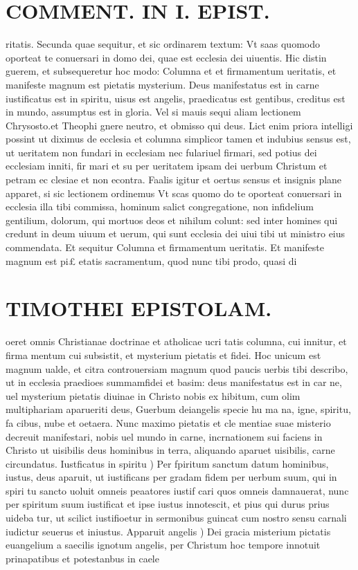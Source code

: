 \documentclass{article}
\begin{document}
\begin{pages}
\section*{COMMENT. IN I. EPIST. }
\marginpar{[ p.90 ]}\pstart ritatis. Secunda quae sequitur, et sic ordinarem textum: Vt saas quomodo oporteat te conuersari in domo dei, quae est ecclesia dei uiuentis. Hic distin guerem, et subsequeretur hoc modo: Columna et et firmamentum ueritatis, et manifeste magnum est pietatis mysterium. Deus manifestatus est in carne iustificatus est in spiritu, uisus est angelis, praedicatus est gentibus, creditus est in mundo, assumptus est in gloria. Vel si mauis sequi aliam lectionem Chrysosto.et Theophi gnere neutro, et obmisso qui deus. Lict enim priora intelligi possint ut diximus de ecclesia et columna simplicor tamen et indubius sensus est, ut ueritatem non fundari in ecclesiam nec fulariuel firmari, sed potius dei ecclesiam inniti, fir mari et su per ueritatem ipsam dei uerbum Christum et petram ec clesiae et non econtra. Faalis igitur et oertus sensus et insignis plane apparet, si sic lectionem ordinemus Vt scas quomo do te oporteat conuersari in ecclesia illa tibi commissa, hominum salict congregatione, non infidelium gentilium, dolorum, qui mortuos deos et nihilum colunt: sed inter homines qui credunt in deum uiuum et uerum, qui sunt ecclesia dei uiui tibi ut ministro eius commendata. Et sequitur Columna et firmamentum ueritatis. Et manifeste magnum est pi£ etatis sacramentum, quod nunc tibi prodo, quasi di\pend
\section*{TIMOTHEI EPISTOLAM. }
\marginpar{[ p.91 ]}\pstart oeret omnis Christianae doctrinae et atholicae ucri tatis columna, cui innitur, et firma mentum cui subsistit, et mysterium pietatis et fidei. Hoc unicum est magnum ualde, et citra controuersiam magnum quod paucis uerbis tibi describo, ut in ecclesia praedioes summamfidei et basim: deus manifestatus est in car ne, uel mysterium pietatis diuinae in Christo nobis ex hibitum, cum olim multiphariam aparueriti deus, Guerbum deiangelis specie hu ma na, igne, spiritu, fa cibus, nube et oetaera. Nunc maximo pietatis et cle mentiae suae misterio decreuit manifestari, nobis uel mundo in carne, incrnationem sui faciens in Christo ut uisibilis deus hominibus in terra, aliquando aparuet uisibilis, carne circundatus.  \pend\pstart Iustficatus in spiritu ) Per fpiritum sanctum datum hominibus, iustus, deus aparuit, ut iustificans per gradam fidem per uerbum suum, qui in spiri tu sancto uoluit omneis peaatores iustif cari quos omneis damnauerat, nunc per spiritum suum iustificat et ipse iustus innotescit, et pius qui durus prius uideba tur, ut scilict iustifioetur in sermonibus guincat cum nostro sensu carnali iudictur seuerus et iniustus. Apparuit angelis ) Dei gracia misterium pictatis euangelium a saecilis ignotum angelis, per Christum hoc tempore innotuit prinapatibus et potestanbus in caele  \pend

\end{pages}
\end{document}
